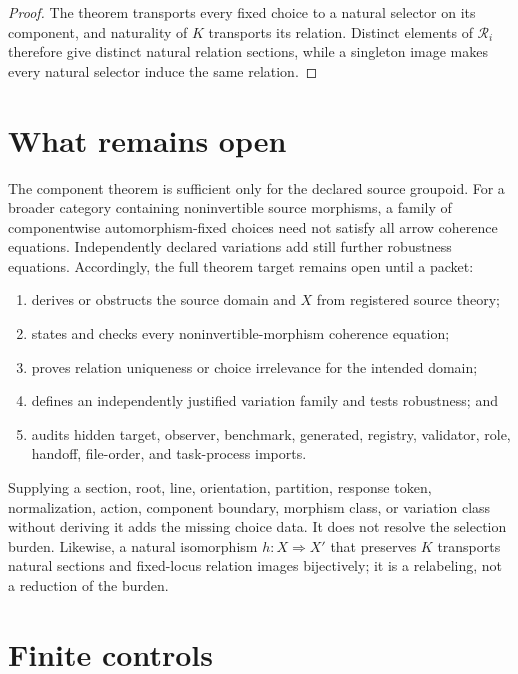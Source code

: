 \documentclass[11pt]{article}
\begin{document}
\begin{proof}
The theorem transports every fixed choice to a natural selector on its
component, and naturality of \(K\) transports its relation. Distinct elements
of \(\mathcal R_i\) therefore give distinct natural relation sections, while
a singleton image makes every natural selector induce the same relation.
\end{proof}

\section{What remains open}

The component theorem is sufficient only for the declared source groupoid.
For a broader category containing noninvertible source morphisms, a family of
componentwise automorphism-fixed choices need not satisfy all arrow
coherence equations. Independently declared variations add still further
robustness equations. Accordingly, the full theorem target remains open
until a packet:
\begin{enumerate}[label=(O\arabic*)]
  \item derives or obstructs the source domain and \(X\) from registered
  source theory;
  \item states and checks every noninvertible-morphism coherence equation;
  \item proves relation uniqueness or choice irrelevance for the intended
  domain;
  \item defines an independently justified variation family and tests
  robustness; and
  \item audits hidden target, observer, benchmark, generated, registry,
  validator, role, handoff, file-order, and task-process imports.
\end{enumerate}

Supplying a section, root, line, orientation, partition, response token,
normalization, action, component boundary, morphism class, or variation class
without deriving it adds the missing choice data. It does not resolve the
selection burden. Likewise, a natural isomorphism \(h:X\Rightarrow X'\) that
preserves \(K\) transports natural sections and fixed-locus relation images
bijectively; it is a relabeling, not a reduction of the burden.

\section{Finite controls}
\end{document}
